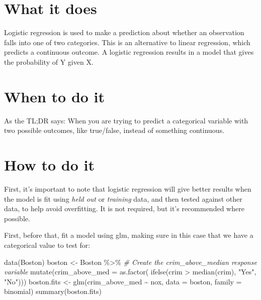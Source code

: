 \documentclass[
]{book}
\newenvironment{Shaded}{\begin{snugshade}}{\end{snugshade}}
\newcommand{\AttributeTok}[1]{\textcolor[rgb]{0.77,0.63,0.00}{#1}}
\newcommand{\CommentTok}[1]{\textcolor[rgb]{0.56,0.35,0.01}{\textit{#1}}}
\newcommand{\FunctionTok}[1]{\textcolor[rgb]{0.00,0.00,0.00}{#1}}
\newcommand{\NormalTok}[1]{#1}
\newcommand{\OtherTok}[1]{\textcolor[rgb]{0.56,0.35,0.01}{#1}}
\newcommand{\SpecialCharTok}[1]{\textcolor[rgb]{0.00,0.00,0.00}{#1}}
\newcommand{\StringTok}[1]{\textcolor[rgb]{0.31,0.60,0.02}{#1}}
\begin{document}
\hypertarget{what-it-does-2}{%
\section{What it does}\label{what-it-does-2}}

Logistic regression is used to make a prediction about whether an observation falls into one of two categories. This is an alternative to linear regression, which predicts a continuous outcome. A logistic regression results in a model that gives the probability of Y given X.

\hypertarget{when-to-do-it-2}{%
\section{When to do it}\label{when-to-do-it-2}}

As the TL;DR says: When you are trying to predict a categorical variable with two possible outcomes, like true/false, instead of something continuous.

\hypertarget{how-to-do-it-2}{%
\section{How to do it}\label{how-to-do-it-2}}

First, it's important to note that logistic regression will give better results when the model is fit using \emph{held out} or \emph{training} data, and then tested against other data, to help avoid overfitting. It is not required, but it's recommended where possible.

First, before that, fit a model using glm, making sure in this case that we have a categorical value to test for:

\begin{Shaded}
\begin{Highlighting}[]
\FunctionTok{data}\NormalTok{(Boston)}
\NormalTok{boston }\OtherTok{\textless{}{-}}\NormalTok{ Boston }\SpecialCharTok{\%\textgreater{}\%}
  \CommentTok{\# Create the crim\_above\_median response variable}
  \FunctionTok{mutate}\NormalTok{(}\AttributeTok{crim\_above\_med =} \FunctionTok{as.factor}\NormalTok{(}
    \FunctionTok{ifelse}\NormalTok{(crim }\SpecialCharTok{\textgreater{}} \FunctionTok{median}\NormalTok{(crim), }\StringTok{"Yes"}\NormalTok{, }\StringTok{"No"}\NormalTok{)))}
\NormalTok{boston.fits }\OtherTok{\textless{}{-}} \FunctionTok{glm}\NormalTok{(crim\_above\_med }\SpecialCharTok{\textasciitilde{}}\NormalTok{ nox, }\AttributeTok{data =}\NormalTok{ boston, }\AttributeTok{family =}\NormalTok{ binomial)}
\FunctionTok{summary}\NormalTok{(boston.fits)}
\end{Highlighting}
\end{Shaded}
\end{document}
